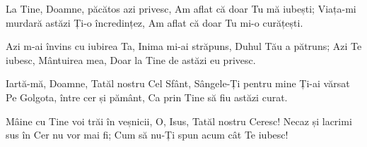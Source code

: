 \beginverse
La Tine, Doamne, păcătos azi privesc,
Am aflat că doar Tu mă iubești;
Viața-mi murdară astăzi Ți-o încredințez,
Am aflat că doar Tu mi-o curățești.
\endverse

\beginchorus
Azi m-ai învins cu iubirea Ta,
Inima mi-ai străpuns, Duhul Tău a pătruns;
Azi Te iubesc, Mântuirea mea,
Doar la Tine de astăzi eu privesc.
\endchorus

\beginverse
Iartă-mă, Doamne, Tatăl nostru Cel Sfânt,
Sângele-Ți pentru mine Ți-ai vărsat
Pe Golgota, între cer și pământ,
Ca prin Tine să fiu astăzi curat.
\endverse

\beginverse
Mâine cu Tine voi trăi în veșnicii,
O, Isus, Tatăl nostru Ceresc!
Necaz și lacrimi sus în Cer nu vor mai fi;
Cum să nu-Ți spun acum cât Te iubesc!
\endverse
\endsong
